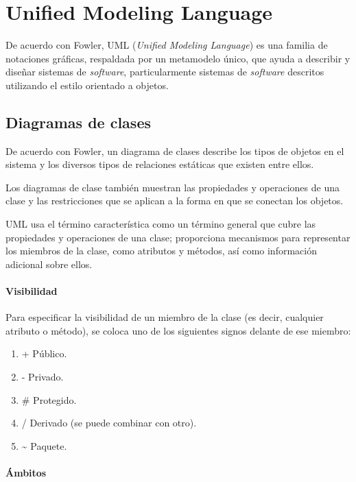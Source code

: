 \section{Unified Modeling Language}

De acuerdo con Fowler\cite{fowler_brief_2003}, UML (\textit{Unified Modeling Language}) es una familia de notaciones gráficas, respaldada por un metamodelo único, que ayuda a describir y diseñar sistemas de \textit{software}, particularmente sistemas de \textit{software} descritos utilizando el estilo orientado a objetos.

\subsection{Diagramas de clases}

De acuerdo con Fowler\cite{fowler_brief_2003}, un diagrama de clases describe los tipos de objetos en el sistema y los diversos tipos de relaciones estáticas que existen entre ellos. 


Los diagramas de clase también muestran las propiedades y operaciones de una clase y las restricciones que se aplican a la forma en que se conectan los objetos.


UML usa el término característica como un término general que cubre las propiedades y operaciones de una clase; proporciona mecanismos para representar los miembros de la clase, como atributos y métodos, así como información adicional sobre ellos.


\paragraph*{Visibilidad}
Para especificar la visibilidad de un miembro de la clase (es decir, cualquier atributo o método), se coloca uno de los siguientes signos delante de ese miembro:

\begin{enumerate}
    \item +	Público.
    \item -	Privado.
    \item \# Protegido.
    \item /	Derivado (se puede combinar con otro).
    \item \~ \;	Paquete.
\end{enumerate}

\paragraph*{Ámbitos}

